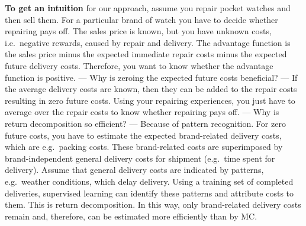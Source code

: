 \documentclass{article}
\begin{document}
{\bf To get an intuition} for our approach,
assume you repair pocket watches and then sell them.
For a particular brand of watch you have to decide
whether repairing pays off.
The sales price is known,
but you have unknown costs, 
i.e.\ negative rewards, caused by repair and delivery.
The advantage function is
the sales price
minus the expected immediate repair costs
minus the expected future delivery costs.
Therefore, you want to know whether the advantage function is positive.
--- Why is zeroing the expected future costs beneficial? ---
If the average delivery costs are known,
then they can be added to the repair costs
resulting in zero future costs.
Using your repairing experiences,
you just have to average over the repair costs
to know whether repairing pays off.
--- Why is return decomposition so efficient? ---
Because of pattern recognition.
For zero future costs, you have to estimate
the expected brand-related delivery costs,
which are e.g.\ packing costs.
These brand-related costs are superimposed by 
brand-independent general delivery costs 
for shipment (e.g.\ time spent for delivery).
Assume that general delivery costs
are indicated by patterns, e.g.\ weather conditions, which delay delivery.
Using a training set of completed deliveries,
supervised learning can identify these patterns
and attribute costs to them.
This is return decomposition.
In this way, only brand-related delivery costs remain 
and, therefore, can be estimated more efficiently than by MC.
\end{document}
